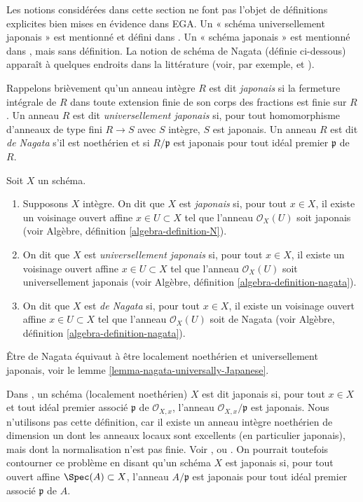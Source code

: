 \noindent
Les notions considérées dans cette section ne font pas l'objet de définitions explicites bien mises en
évidence dans EGA. Un « schéma universellement japonais » est mentionné et défini dans
\cite[IV Corollary 5.11.4]{EGA}. Un « schéma japonais » est mentionné dans
\cite[IV remarque 10.4.14 (ii)]{EGA}, mais sans définition. La notion
de schéma de Nagata (définie ci-dessous) apparaît à
quelques endroits dans la littérature (voir, par exemple, \cite[définition 8.2.30]{Liu} et
\cite[Page 142]{Greco}).

\medskip\noindent
Rappelons brièvement qu'un anneau intègre $R$ est dit {\it japonais} si la fermeture
intégrale de $R$ dans toute extension finie de son corps des fractions est finie sur
$R$. Un anneau $R$ est dit {\it universellement japonais} si, pour tout homomorphisme d'anneaux
de type fini $R \to S$ avec $S$ intègre, $S$ est japonais. Un anneau $R$ est dit
{\it de Nagata} s'il est noethérien et si $R/\mathfrak p$ est japonais pour tout idéal
premier $\mathfrak p$ de $R$.

\begin{definition}
\label{definition-nagata}
Soit $X$ un schéma.
\begin{enumerate}
\item Supposons $X$ intègre. On dit que $X$ est {\it japonais}
si, pour tout $x \in X$, il existe un
voisinage ouvert affine $x \in U \subset X$ tel que l'anneau
$\mathcal{O}_X(U)$ soit japonais
(voir Algèbre, définition \ref{algebra-definition-N}).
\item On dit que $X$ est {\it universellement japonais} si, pour tout $x \in X$,
il existe un voisinage ouvert affine $x \in U \subset X$ tel que
l'anneau $\mathcal{O}_X(U)$ soit universellement japonais
(voir Algèbre, définition \ref{algebra-definition-nagata}).
\item On dit que $X$ est {\it de Nagata} si, pour tout $x \in X$, il existe un
voisinage ouvert affine $x \in U \subset X$ tel que l'anneau
$\mathcal{O}_X(U)$ soit de Nagata
(voir Algèbre, définition \ref{algebra-definition-nagata}).
\end{enumerate}
\end{definition}

\noindent
Être de Nagata équivaut à être localement noethérien et
universellement japonais, voir le
lemme \ref{lemma-nagata-universally-Japanese}.

\begin{remark}
\label{remark-non-integral-Japanese}
Dans \cite{Hoobler-finite}, un schéma (localement noethérien) $X$ est dit
japonais si, pour tout $x \in X$ et tout idéal premier associé $\mathfrak p$
de $\mathcal{O}_{X, x}$, l'anneau $\mathcal{O}_{X, x}/\mathfrak p$ est
japonais. Nous n'utilisons pas cette définition, car il existe un anneau
intègre noethérien de dimension un dont les anneaux locaux sont excellents
(en particulier japonais), mais dont la normalisation n'est pas finie. Voir
\cite[exemple 1]{Hochster-loci}, \cite{Heinzer-Levy} ou
\cite[Exposé XIX]{Traveaux}.
On pourrait toutefois contourner ce problème en disant qu'un schéma
$X$ est japonais si, pour tout ouvert affine $\Spec(A) \subset X$, l'anneau
$A/\mathfrak p$ est japonais pour tout idéal premier associé $\mathfrak p$ de $A$.
\end{remark}

